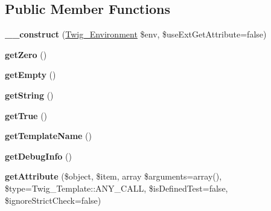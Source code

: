 \subsection*{Public Member Functions}
\begin{DoxyCompactItemize}
\item 
{\bfseries \+\_\+\+\_\+construct} (\hyperlink{classTwig__Environment}{Twig\+\_\+\+Environment} \$env, \$use\+Ext\+Get\+Attribute=false)\hypertarget{classTwig__TemplateTest_a72eeb4d94a664bfffd5f4f525ec02c87}{}\label{classTwig__TemplateTest_a72eeb4d94a664bfffd5f4f525ec02c87}

\item 
{\bfseries get\+Zero} ()\hypertarget{classTwig__TemplateTest_ad637abed9030b99fa4c581d49cd2d132}{}\label{classTwig__TemplateTest_ad637abed9030b99fa4c581d49cd2d132}

\item 
{\bfseries get\+Empty} ()\hypertarget{classTwig__TemplateTest_a55ca5e84e9ac7848a057947fef281329}{}\label{classTwig__TemplateTest_a55ca5e84e9ac7848a057947fef281329}

\item 
{\bfseries get\+String} ()\hypertarget{classTwig__TemplateTest_a71972949f5aebe74f823466c8618d1ef}{}\label{classTwig__TemplateTest_a71972949f5aebe74f823466c8618d1ef}

\item 
{\bfseries get\+True} ()\hypertarget{classTwig__TemplateTest_aeb369d7dbf4af5d372e6ae5218030d26}{}\label{classTwig__TemplateTest_aeb369d7dbf4af5d372e6ae5218030d26}

\item 
{\bfseries get\+Template\+Name} ()\hypertarget{classTwig__TemplateTest_a5bafe1d958e5d294f714634dd89608a0}{}\label{classTwig__TemplateTest_a5bafe1d958e5d294f714634dd89608a0}

\item 
{\bfseries get\+Debug\+Info} ()\hypertarget{classTwig__TemplateTest_ab38e663652df91140978af9706c76fbb}{}\label{classTwig__TemplateTest_ab38e663652df91140978af9706c76fbb}

\item 
{\bfseries get\+Attribute} (\$object, \$item, array \$arguments=array(), \$type=Twig\+\_\+\+Template\+::\+A\+N\+Y\+\_\+\+C\+A\+LL, \$is\+Defined\+Test=false, \$ignore\+Strict\+Check=false)\hypertarget{classTwig__TemplateTest_a2b431be28a51142b5037e2183e6a4a3c}{}\label{classTwig__TemplateTest_a2b431be28a51142b5037e2183e6a4a3c}

\end{DoxyCompactItemize}
